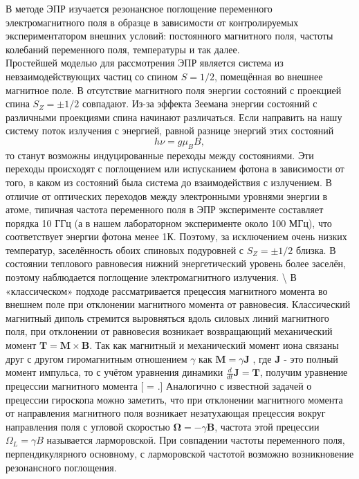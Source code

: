\documentclass[11pt]{article}
\begin{document}
В методе ЭПР изучается резонансное поглощение переменного
электромагнитного поля в образце в зависимости от контролируемых
экспериментатором внешних условий: постоянного магнитного поля, частоты
колебаний переменного поля, температуры и так далее.\\
Простейшей моделью для рассмотрения ЭПР является система из
невзаимодействующих частиц со спином \(S = 1/2\), помещённая во внешнее
магнитное поле. В отсутствие магнитного поля энергии состояний с
проекцией спина \(S_Z = \pm 1/2\) совпадают. Из-за эффекта Зеемана
энергии состояний с различными проекциями спина начинают различаться.
Если направить на нашу систему поток излучения с энергией, равной
разнице энергий этих состояний \begin{equation}\label{2}
h \nu = g\mu_B B,
\end{equation} то станут возможны индуцированные переходы между
состояниями. Эти переходы происходят с поглощением или испусканием
фотона в зависимости от того, в каком из состояний была система до
взаимодействия с излучением. В отличие от оптических переходов между
электронными уровнями энергии в атоме, типичная частота переменного поля
в ЭПР эксперименте составляет порядка 10 ГГц (а в нашем лабораторном
эксперименте около 100 МГц), что соответствует энергии фотона менее 1К.
Поэтому, за исключением очень низких температур, заселённость обоих
спиновых подуровней с \(S_Z = \pm 1/2\) близка. В состоянии теплового
равновесия нижний энергетический уровень более заселён, поэтому
наблюдается поглощение электромагнитного излучения. \textbackslash{} В
«классическом» подходе рассматривается прецессия магнитного момента во
внешнем поле при отклонении магнитного момента от равновесия.
Классический магнитный диполь стремится выровняться вдоль силовых линий
магнитного поля, при отклонении от равновесия возникает возвращающий
механический момент \(\mathbf{T} = \mathbf{M}\times \mathbf{B}\). Так
как магнитный и механический момент иона связаны друг с другом
гиромагнитным отношением \(\gamma\) как \(\mathbf{M}=\gamma \mathbf{J}\)
, где \(\mathbf{J}\) - это полный момент импульса, то с учётом уравнения
динамики \(\frac{d}{dt}\mathbf{J} = \mathbf{T}\), получим уравнение
прецессии магнитного момента {[} =
\gamma {} \times {}.{]} Аналогично с известной задачей о
прецессии гироскопа можно заметить, что при отклонении магнитного
момента от направления магнитного поля возникает незатухающая прецессия
вокруг направления поля с угловой скоростью
\(\boldsymbol{\Omega} = -\gamma \mathbf{B}\), частота этой прецессии
\(\Omega_L = \gamma B\) называется ларморовской. При совпадении частоты
переменного поля, перпендикулярного основному, с ларморовской частотой
возможно возникновение резонансного поглощения.
\end{document}

